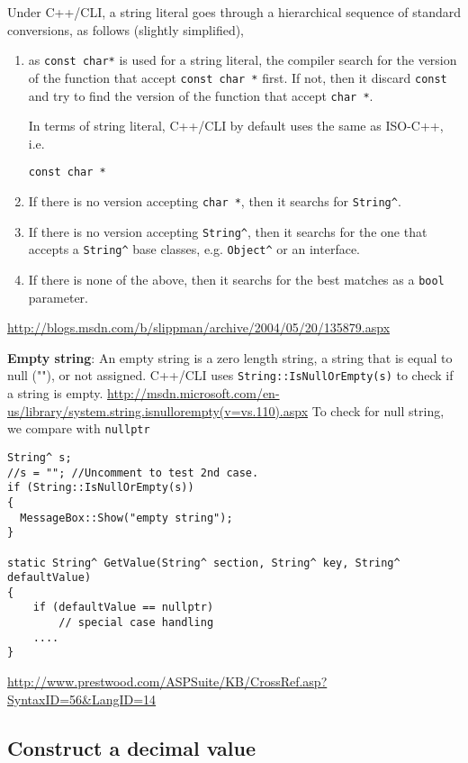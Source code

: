 Under C++/CLI, a string literal goes through a hierarchical sequence of standard
conversions, as follows (slightly simplified),
\begin{enumerate}
  \item as \verb!const char*! is used for a string literal, the compiler search
  for the version of the function that accept \verb!const char *! first. If not,
  then it discard \verb!const! and try to find the version of the function that
  accept \verb!char *!.
  
  In terms of string literal, C++/CLI by default uses the same as ISO-C++, i.e.
\begin{verbatim}
const char *
\end{verbatim}
   
  \item If there is no version accepting \verb!char *!, then it searchs for
  \verb!String^!.
  
  \item If there is no version accepting \verb!String^!, then it searchs for the
  one that accepts a \verb!String^! base classes, e.g. \verb!Object^! or an
  interface. 
  
  \item If there is none of the above, then it searchs for the best matches as
  a \verb!bool! parameter. 
\end{enumerate}
\url{http://blogs.msdn.com/b/slippman/archive/2004/05/20/135879.aspx}

{\bf Empty string}: An empty string is a zero length string, a string that is
equal to null (""), or not assigned. C++/CLI uses
\verb!String::IsNullOrEmpty(s)! to check if a string is empty. 
\url{http://msdn.microsoft.com/en-us/library/system.string.isnullorempty(v=vs.110).aspx}
To check for null string, we compare with \verb!nullptr!

\begin{verbatim}
String^ s;
//s = ""; //Uncomment to test 2nd case.
if (String::IsNullOrEmpty(s))
{
  MessageBox::Show("empty string");
}

static String^ GetValue(String^ section, String^ key, String^ defaultValue)
{
    if (defaultValue == nullptr)
        // special case handling
    ....
}
\end{verbatim}
\url{http://www.prestwood.com/ASPSuite/KB/CrossRef.asp?SyntaxID=56&LangID=14}
\subsection{Construct a decimal value}

